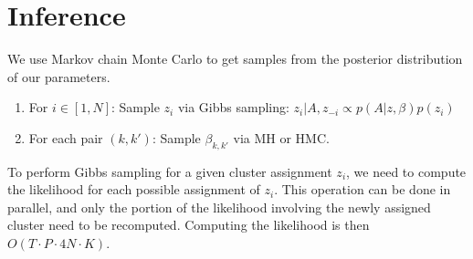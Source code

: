 \documentclass{article}
\begin{document}
\section{Inference}

We use Markov chain Monte Carlo to get samples from the posterior distribution of our parameters.  

\begin{enumerate}
\item For $i \in [1,N]$: Sample $z_i$ via Gibbs sampling: 
$z_i | A, z_{-i} \propto p(A|z,\beta) p(z_i)$
\item For each pair $(k,k')$: Sample $\beta_{k,k'}$ via MH or HMC.
\end{enumerate}

To perform Gibbs sampling for a given cluster assignment $z_i$, we need to compute the likelihood for each possible assignment of $z_i$. 
This operation can be done in parallel, and only the portion of the likelihood involving the newly assigned cluster  need to be recomputed.  Computing the likelihood is then $O(T \cdot P \cdot 4N \cdot K)$.




\end{document}
